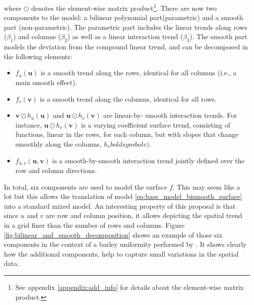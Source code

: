 where $\odot$ denotes the element-wise matrix product\footnote{See appendix \ref{appendix:add_info} for details about the element-wise matrix product.}. There are now two components to the model: a bilinear polynomial part(parametric) and a smooth part (non-parametric). The parametric part includes the linear trends along rows ($\beta_1$) and columns ($\beta_2$) as well as a linear interaction trend ($\beta_3$). The smooth part models the deviation from the compound linear trend, and can be decomposed in the following elements:
	\begin{itemize}
		\item $f_{u}(\boldsymbol{u})$  is a smooth trend along the rows, identical for all columns (i.e., a main smooth effect).
		\item $f_{v}(\boldsymbol{v})$ is a smooth trend along the columns, identical for all rows.
		\item $\boldsymbol{v} \odot h_{u} (\boldsymbol{u})$ and $\boldsymbol{u} \odot h_{v} (\boldsymbol{v})$ are linear-by-
		smooth interaction trends. For instance, $\boldsymbol{u} \odot h_{v}(\boldsymbol{v})$ is a varying coefficient surface 
		trend, consisting of functions, linear in the rows, for each column, but with slopes that change smoothly along the 
		columns, $h_{v}boldsymbol{v})$.
		\item $f_{u,v}(\boldsymbol{u},\boldsymbol{v})$ is a smooth-by-smooth interaction trend jointly defined over the row and 
		column directions.
	\end{itemize}
In total, six components are used to model the surface $f$. This may seem like a lot but this allows the translation of model \ref{eq:base_model_bismooth_surface} into a standard mixed model. An interesting property of this proposal is that since $u$ and $v$ are row and column position, it allows depicting the spatial trend in a grid finer than the number of rows and columns. Figure \ref{fig:bilinear_and_smooth_decomposition} shows an example of those six components in the context of a barley uniformity performed by \textcite{williams1988contemporary}. It shows clearly how the additional components, help to capture small variations in the spatial data.

